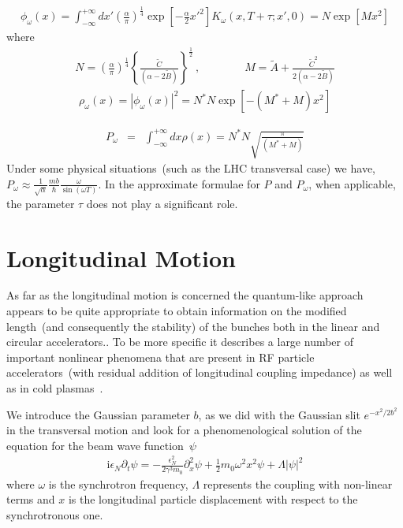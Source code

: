 \documentclass[]{article}
\begin{document}
\begin{eqnarray}
\phi_{\omega} (x) 
= 
\int_{- \infty}^{+ \infty} d x'
\left(\frac{\alpha}{\pi} \right)^{\frac{1}{4}}
\exp{\left[- \frac{\alpha}{2} x'^2\right]}
K_{\omega} \left(x, T + \tau ; x', 0\right) 
= 
N \exp{\left[M x^2 \right]}
\label{po}
\end{eqnarray}
%
where
\begin{eqnarray}
N = 
\left(\frac{\alpha}{\pi}\right)^{\frac{1}{4}}
\left\{
\frac{\tilde{C}}{\left(\alpha - 2 \tilde{B}\right)} 
\right\}^{\frac{1}{2}}\,, \qquad \qquad 
M =
\tilde{A}
+
\frac{\tilde{C}^2}{2 \left(\alpha - 2 \tilde{B}\right)} 
\end{eqnarray}
%
\begin{eqnarray}
\rho_{\omega} (x) = \left| \phi_{\omega} (x) \right|^2 
= N^{*} N \exp{\left[ - \left(M^{*} + M \right) x^2 \right]}
\end{eqnarray}
%

\begin{eqnarray}
P_{\omega} & = & \int_{- \infty} ^{+ \infty} d x \rho ( x ) 
= N^{*} N \sqrt{\frac{\pi}{\left(M^{*} + M\right)}}
\label{probability-w}
\end{eqnarray}
%
Under some physical situations~(such as the LHC transversal case) we have,
$P_{\omega} \approx 
\frac{1}{\sqrt{\alpha}} \frac{m b}{\hbar} 
\frac{\omega}{\sin \left(\omega T\right)}$.
In the approximate formulae for $P$ and $P_{\omega}$, when applicable, the 
parameter $\tau$ does not play a significant role.

\section{Longitudinal Motion}
As far as the longitudinal motion is concerned the quantum-like approach
appears to be quite appropriate to obtain information on the modified
length~(and consequently the stability) of the bunches both in the linear
and circular accelerators.. To be more specific it describes a large number
of important nonlinear phenomena that are present in RF particle
accelerators~(with residual addition of longitudinal coupling impedance)
as well as in cold plasmas~\cite{Plasma}. 

We introduce the Gaussian parameter $b$, as we did with the Gaussian 
slit $e^{{-x^2}/{2 b^2}}$ in the transversal motion and look for a 
phenomenological solution of the equation for the beam wave 
function~$\psi$
\begin{eqnarray}
\mathrm{i}\epsilon_N \partial_t \psi 
= - \frac{\epsilon_N^2}{2 \gamma^3 m_0} \partial_x^2 \psi 
+ \frac{1}{2} m_0 \omega^2 x^2 \psi + \Lambda \left| \psi \right|^2 
\label{schroedinger-nonlinear}
\end{eqnarray}
%
where $\omega$ is the synchrotron frequency, $\Lambda$ represents the 
coupling with non-linear terms and $x$ is the longitudinal particle
displacement with respect to the synchrotronous one.
\end{document}
